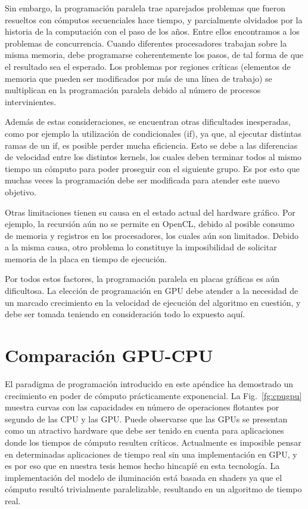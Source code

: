 Sin embargo, la programación paralela trae aparejados problemas que fueron resueltos con cómputos secuenciales hace tiempo, y parcialmente olvidados por la historia de la computación con el paso de los años.
Entre ellos encontramos a los problemas de concurrencia.
Cuando diferentes procesadores trabajan sobre la misma memoria, debe programarse coherentemente los pasos, de tal forma de que el resultado sea el esperado.
Los problemas por regiones críticas (elementos de memoria que pueden ser modificados por más de una línea de trabajo) se multiplican en la programación paralela debido al número de procesos intervinientes.

Además de estas consideraciones, se encuentran otras dificultades inesperadas, como por ejemplo la utilización de condicionales (if), ya que, al ejecutar distintas ramas de un if, es posible perder mucha eficiencia.
Esto se debe a las diferencias de velocidad entre los distintos kernels, los cuales deben terminar todos al mismo tiempo un cómputo para poder proseguir con el siguiente grupo.
Es por esto que muchas veces la programación debe ser modificada para atender este nuevo objetivo.

Otras limitaciones tienen su causa en el estado actual del hardware gráfico.
Por ejemplo, la recursión aún no se permite en OpenCL, debido al posible consumo de memoria y registros en los procesadores, los cuales aún son limitados.
Debido a la misma causa, otro problema lo constituye la imposibilidad de solicitar memoria de la placa en tiempo de ejecución.

Por todos estos factores, la programación paralela en placas gráficas es aún dificultosa.
La elección de programación en GPU debe atender a la necesidad de un marcado crecimiento en la velocidad de ejecución del algoritmo en cuestión, y debe ser tomada teniendo en consideración todo lo expuesto aquí.

\section{Comparación GPU-CPU}
El paradigma de programación introducido en este apéndice ha demostrado un crecimiento en poder de cómputo prácticamente exponencial.
La Fig.~\ref{fg:cpugpu} muestra curvas con las capacidades en número de operaciones flotantes por segundo de las CPU y las GPU.
Puede observarse que las GPUs se presentan como un atractivo hardware que debe ser tenido en cuenta para aplicaciones donde los tiempos de cómputo resulten críticos.
Actualmente es imposible pensar en determinadas aplicaciones de tiempo real sin una implementación en GPU, y es por eso que en nuestra tesis hemos hecho hincapíé en esta tecnología.
La implementación del modelo de iluminación está basada en shaders ya que el cómputo resultó trivialmente paralelizable, resultando en un algoritmo de tiempo real.


